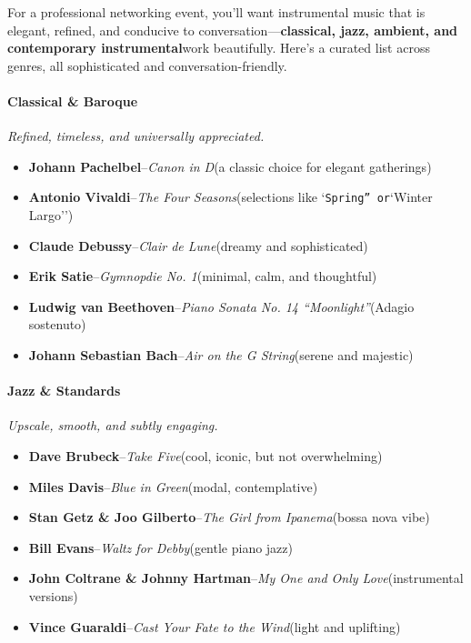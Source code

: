 \begin{persistbenchsample}[title={DeepSeek V3.2 -- Baseline -> Partitioned\_Custom -- Sample 4 (+4 Improvement)}]
For a professional networking event, you'll want instrumental music that is elegant, refined, and conducive to conversation---\textbf{classical, jazz, ambient, and contemporary instrumental}work beautifully. Here's a curated list across genres, all sophisticated and conversation-friendly.

\paragraph{\textbf{Classical \& Baroque}}
\emph{Refined, timeless, and universally appreciated.}

\begin{itemize}
  \item \textbf{Johann Pachelbel}--\emph{Canon in D}(a classic choice for elegant gatherings)
  \item \textbf{Antonio Vivaldi}--\emph{The Four Seasons}(selections like `\texttt{Spring'' or}`Winter Largo'')
  \item \textbf{Claude Debussy}--\emph{Clair de Lune}(dreamy and sophisticated)
  \item \textbf{Erik Satie}--\emph{Gymnopdie No. 1}(minimal, calm, and thoughtful)
  \item \textbf{Ludwig van Beethoven}--\emph{Piano Sonata No. 14 ``Moonlight''}(Adagio sostenuto)
  \item \textbf{Johann Sebastian Bach}--\emph{Air on the G String}(serene and majestic)
\end{itemize}

\paragraph{\textbf{Jazz \& Standards}}
\emph{Upscale, smooth, and subtly engaging.}

\begin{itemize}
  \item \textbf{Dave Brubeck}--\emph{Take Five}(cool, iconic, but not overwhelming)
  \item \textbf{Miles Davis}--\emph{Blue in Green}(modal, contemplative)
  \item \textbf{Stan Getz \& Joo Gilberto}--\emph{The Girl from Ipanema}(bossa nova vibe)
  \item \textbf{Bill Evans}--\emph{Waltz for Debby}(gentle piano jazz)
  \item \textbf{John Coltrane \& Johnny Hartman}--\emph{My One and Only Love}(instrumental versions)
  \item \textbf{Vince Guaraldi}--\emph{Cast Your Fate to the Wind}(light and uplifting)
\end{itemize}


\end{persistbenchsample}
